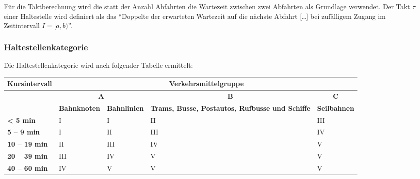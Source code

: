 Für die Taktberechnung wird die statt der Anzahl Abfahrten die Wartezeit zwischen zwei Abfahrten als Grundlage verwendet.
Der Takt $\tau$ einer Haltestelle wird definiert als das "`Doppelte der erwarteten Wartezeit auf die nächste Abfahrt [\ldots] bei zufälligem Zugang im Zeitintervall $I = [a,b)$"'.~\cite{visum_manual_formula}

\subsubsection{Haltestellenkategorie}
\label{Zusammenhang zur Berechnungsmethodik ARE:Haltestellenkategorie}

\begin{itquote}
Die Haltestellenkategorie wird nach folgender Tabelle ermittelt:
\begin{table}[ht]
    \centering
    \begin{itquote}
    \begin{tabular}[c]{l | p{2.3cm} p{2.3cm} | p{2.2cm} | p{2.2cm}}
        \toprule
        \textbf{Kursintervall}
                                & \multicolumn{4}{c}{\textbf{Verkehrsmittelgruppe}}\\
        \midrule
        \textbf{}
                                & \multicolumn{2}{c|}{\textbf{A}}
                                & \multicolumn{1}{c}{\textbf{B}}
                                & \multicolumn{1}{c}{\textbf{C}}\\
        \textbf{}
                                & \textbf{Bahnknoten}
                                & \textbf{Bahnlinien}
                                & \textbf{Trams, Busse, Postautos, Rufbusse und Schiffe}
                                & \textbf{Seilbahnen}\\
        \textbf{< 5 min}
                                & I
                                & I
                                & II
                                & III\\
        \textbf{5 -- 9 min}
                                & I
                                & II
                                & III
                                & IV\\
        \textbf{10 -- 19 min}
                                & II
                                & III
                                & IV
                                & V\\
        \textbf{20 -- 39 min}
                                & III
                                & IV
                                & V
                                & V\\
        \textbf{40 -- 60 min}
                                & IV
                                & V
                                & V
                                & V\\
        \bottomrule
    \end{tabular}
    \end{itquote}
\end{table}
\end{itquote}

